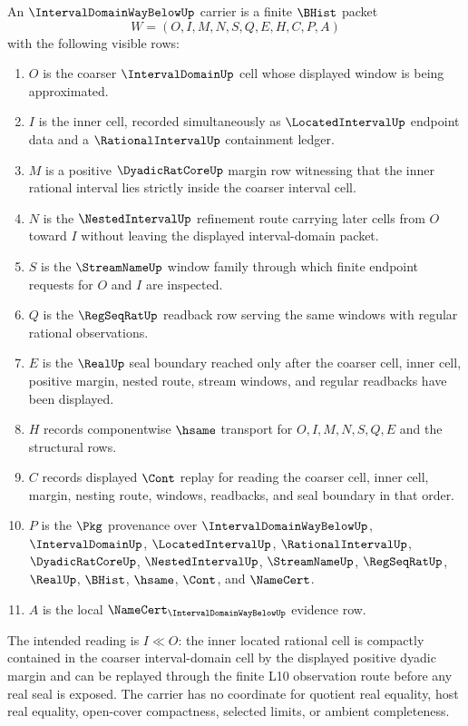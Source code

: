 \begin{definition}
\label{def:interval-domain-way-below-carrier}
An $\IntervalDomainWayBelowUp$ carrier is a finite $\BHist$ packet
$$
W=(O,I,M,N,S,Q,E,H,C,P,A)
$$
with the following visible rows:
\begin{enumerate}
\item $O$ is the coarser $\IntervalDomainUp$ cell whose displayed window is being approximated.
\item $I$ is the inner cell, recorded simultaneously as $\LocatedIntervalUp$ endpoint data and a $\RationalIntervalUp$ containment ledger.
\item $M$ is a positive $\DyadicRatCoreUp$ margin row witnessing that the inner rational interval lies strictly inside the coarser interval cell.
\item $N$ is the $\NestedIntervalUp$ refinement route carrying later cells from $O$ toward $I$ without leaving the displayed interval-domain packet.
\item $S$ is the $\StreamNameUp$ window family through which finite endpoint requests for $O$ and $I$ are inspected.
\item $Q$ is the $\RegSeqRatUp$ readback row serving the same windows with regular rational observations.
\item $E$ is the $\RealUp$ seal boundary reached only after the coarser cell, inner cell, positive margin, nested route, stream windows, and regular readbacks have been displayed.
\item $H$ records componentwise $\hsame$ transport for $O,I,M,N,S,Q,E$ and the structural rows.
\item $C$ records displayed $\Cont$ replay for reading the coarser cell, inner cell, margin, nesting route, windows, readbacks, and seal boundary in that order.
\item $P$ is the $\Pkg$ provenance over $\IntervalDomainWayBelowUp$, $\IntervalDomainUp$, $\LocatedIntervalUp$, $\RationalIntervalUp$, $\DyadicRatCoreUp$, $\NestedIntervalUp$, $\StreamNameUp$, $\RegSeqRatUp$, $\RealUp$, $\BHist$, $\hsame$, $\Cont$, and $\NameCert$.
\item $A$ is the local $\NameCert_{\IntervalDomainWayBelowUp}$ evidence row.
\end{enumerate}
The intended reading is $I\ll O$: the inner located rational cell is compactly contained in the coarser interval-domain cell by the displayed positive dyadic margin and can be replayed through the finite L10 observation route before any real seal is exposed. The carrier has no coordinate for quotient real equality, host real equality, open-cover compactness, selected limits, or ambient completeness.
\end{definition}

